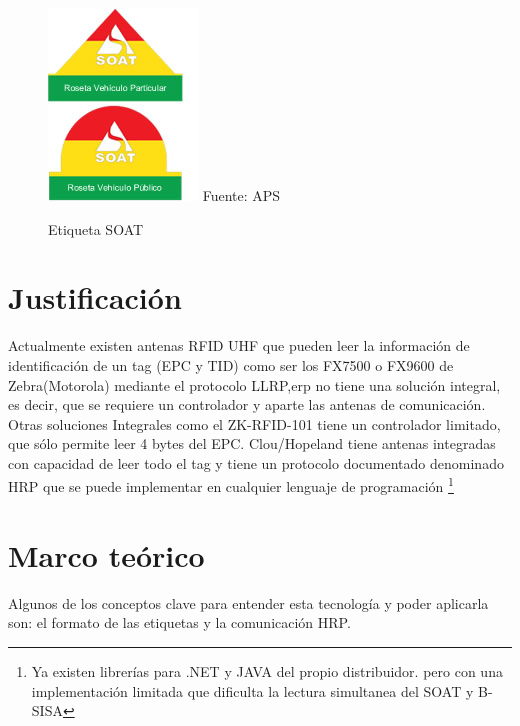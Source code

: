 \documentclass[fleqn,10pt]{SelfArx} %
\begin{document}
\begin{figure}[ht]
\caption{Etiqueta SOAT}
\centering
\includegraphics[width=0.6\linewidth]{roseta_soat.jpg}
\newline Fuente: APS
\label{fig:roseta_soat}
\end{figure}

\section{Justificación}

Actualmente existen antenas RFID UHF que pueden leer la información de identificación de un tag (EPC y TID) como ser los FX7500 o FX9600 de Zebra(Motorola) mediante el protocolo LLRP,erp no tiene una solución integral, es decir, que se requiere un controlador y aparte las antenas de comunicación. Otras soluciones Integrales como el ZK-RFID-101 tiene un controlador limitado, que sólo permite leer 4 bytes del EPC. Clou/Hopeland tiene antenas integradas con capacidad de leer todo el tag y tiene un protocolo documentado denominado HRP que se puede implementar en cualquier lenguaje de programación \footnote{Ya existen librerías para .NET y JAVA del propio distribuidor. pero con una implementación limitada que dificulta la lectura simultanea del SOAT y B-SISA}


\section{Marco teórico}

Algunos de los conceptos clave para entender esta tecnología y poder aplicarla son: el formato de las etiquetas y la comunicación HRP.
\end{document}
